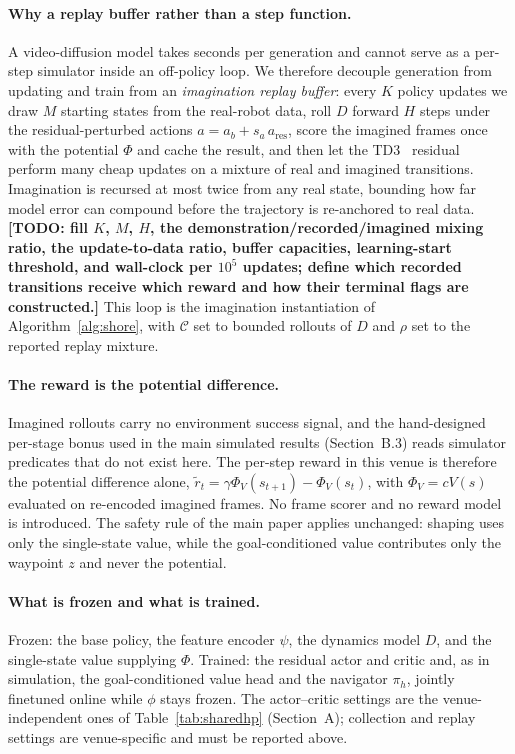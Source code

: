 \documentclass[letterpaper]{article} %
\newcommand{\todo}[1]{\textbf{[TODO: #1]}}
\begin{document}
\paragraph{Why a replay buffer rather than a step function.}
A video-diffusion model takes seconds per generation and cannot serve as a
per-step simulator inside an off-policy loop. We therefore decouple generation
from updating and train from an \emph{imagination replay buffer}: every $K$
policy updates we draw $M$ starting states from the real-robot data, roll $D$
forward $H$ steps under the residual-perturbed actions
$a = a_b + s_a\,a_{\text{res}}$, score the imagined frames once with the
potential $\Phi$ and cache the result, and then let the
TD3~\cite{fujimoto2018addressing} residual perform many
cheap updates on a mixture of real and imagined transitions. Imagination is
recursed at most twice from any real state, bounding how far model error can
compound before the trajectory is re-anchored to real data.
\todo{fill $K$, $M$, $H$, the demonstration/recorded/imagined mixing ratio, the
update-to-data ratio, buffer capacities, learning-start threshold, and wall-clock per
$10^5$ updates; define which recorded transitions receive which reward and how their
terminal flags are constructed.}
This loop is the imagination instantiation of Algorithm~\ref{alg:shore}, with
$\mathcal C$ set to bounded rollouts of $D$ and $\rho$ set to the reported replay mixture.

\paragraph{The reward is the potential difference.}
Imagined rollouts carry no environment success signal, and the hand-designed
per-stage bonus used in the main simulated results (Section~B.3) reads simulator
predicates that do not exist here. The per-step reward in this venue is therefore the
potential difference alone, $\tilde r_t=\gamma\Phi_V(s_{t+1})-\Phi_V(s_t)$, with
$\Phi_V=cV(s)$ evaluated on re-encoded imagined frames. No frame scorer and no reward
model is introduced.
The safety rule of the main paper applies unchanged: shaping uses only the
single-state value, while the goal-conditioned value contributes only the waypoint
$z$ and never the potential.

\paragraph{What is frozen and what is trained.}
Frozen: the base policy, the feature encoder $\psi$, the dynamics model $D$, and
the single-state value supplying $\Phi$. Trained: the residual actor and critic
and, as in simulation, the goal-conditioned value head and the navigator
$\pi_h$, jointly finetuned online while $\phi$ stays frozen. The actor--critic settings are the venue-independent ones of
Table~\ref{tab:sharedhp} (Section~A); collection and replay settings are venue-specific
and must be reported above.
\end{document}
